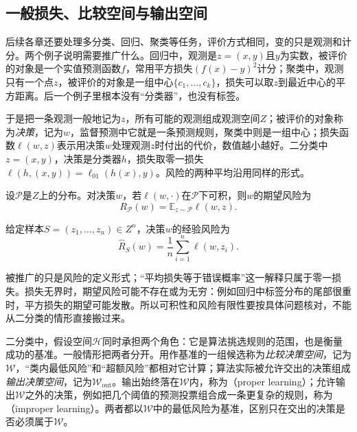 \subsection{一般损失、比较空间与输出空间}
\label{sec:pac-general-form}
\label{sec:learning-problem-general-risk}

后续各章还要处理多分类、回归、聚类等任务，评价方式相同，变的只是观测和计分。两个例子说明需要推广什么。回归中，观测是$z=(x,y)$且$y$为实数，被评价的对象是一个实值预测函数$f$，常用平方损失$(f(x)-y)^2$计分；聚类中，观测只有一个点$z$，被评价的对象是一组中心$\{c_1,\ldots,c_k\}$，损失可以取$z$到最近中心的平方距离。后一个例子里根本没有“分类器”，也没有标签。

于是把一条观测一般地记为$z$，所有可能的观测组成观测空间$Z$；被评价的对象称为\emph{决策}，记为$w$，监督预测中它就是一条预测规则，聚类中则是一组中心；损失函数$\ell(w,z)$表示用决策$w$处理观测$z$时付出的代价，数值越小越好。二分类中$z=(x,y)$，决策是分类器$h$，损失取零一损失$\ell(h,(x,y))=\ell_{01}(h(x),y)$。风险的两种平均沿用同样的形式。

\begin{definition}[一般学习问题的期望风险]
\label{def:general-population-risk}
设$\mathcal P$是$Z$上的分布。对决策$w$，若$\ell(w,\cdot)$在$\mathcal P$下可积，则$w$的期望风险为
\[
 R_{\mathcal P}(w)=\mathbb E_{z\sim\mathcal P}\ell(w,z).
\]
\end{definition}

\begin{definition}[一般学习问题的经验风险]
\label{def:general-empirical-risk}
给定样本$S=(z_1,\ldots,z_n)\in Z^n$，决策$w$的经验风险为
\begin{equation}
 \hat R_S(w)=\frac1n\sum_{i=1}^n\ell(w,z_i).
 \label{eq:general-risk}
\end{equation}
\end{definition}

被推广的只是风险的定义形式；“平均损失等于错误概率”这一解释只属于零一损失。损失无界时，期望风险可能不存在或为无穷：例如回归中标签分布的尾部很重时，平方损失的期望可能发散。所以可积性和风险有限性要按具体问题核对，不能从二分类的情形直接搬过来。

二分类中，假设空间$\mathcal H$同时承担两个角色：它是算法挑选规则的范围，也是衡量成功的基准。一般情形把两者分开。用作基准的一组候选称为\emph{比较决策空间}，记为$\mathcal W$，“类内最低风险”和“超额风险”都相对它计算；算法实际被允许交出的决策组成\emph{输出决策空间}，记为$\mathcal W_{\mathrm{out}}$。输出始终落在$\mathcal W$内，称为（proper learning）；允许输出$\mathcal W$之外的决策，例如把几个阈值的预测投票组合成一条更复杂的规则，称为（improper learning）。两者都以$\mathcal W$中的最低风险为基准，区别只在交出的决策是否必须属于$\mathcal W$。

